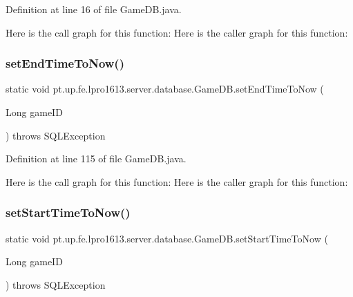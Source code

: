 Definition at line 16 of file Game\+D\+B.\+java.

Here is the call graph for this function\+:
Here is the caller graph for this function\+:
\hypertarget{classpt_1_1up_1_1fe_1_1lpro1613_1_1server_1_1database_1_1_game_d_b_ab352e7cd06250b77274f5c4f261f8116}{}\label{classpt_1_1up_1_1fe_1_1lpro1613_1_1server_1_1database_1_1_game_d_b_ab352e7cd06250b77274f5c4f261f8116} 
\subsubsection{\texorpdfstring{set\+End\+Time\+To\+Now()}{setEndTimeToNow()}}
{\footnotesize\ttfamily static void pt.\+up.\+fe.\+lpro1613.\+server.\+database.\+Game\+D\+B.\+set\+End\+Time\+To\+Now (\begin{DoxyParamCaption}\item[{Long}]{game\+ID }\end{DoxyParamCaption}) throws S\+Q\+L\+Exception\hspace{0.3cm}{\ttfamily [static]}}



Definition at line 115 of file Game\+D\+B.\+java.

Here is the call graph for this function\+:
Here is the caller graph for this function\+:
\hypertarget{classpt_1_1up_1_1fe_1_1lpro1613_1_1server_1_1database_1_1_game_d_b_a991c06b53598f46f4eea30c8c8fc31f7}{}\label{classpt_1_1up_1_1fe_1_1lpro1613_1_1server_1_1database_1_1_game_d_b_a991c06b53598f46f4eea30c8c8fc31f7} 
\subsubsection{\texorpdfstring{set\+Start\+Time\+To\+Now()}{setStartTimeToNow()}}
{\footnotesize\ttfamily static void pt.\+up.\+fe.\+lpro1613.\+server.\+database.\+Game\+D\+B.\+set\+Start\+Time\+To\+Now (\begin{DoxyParamCaption}\item[{Long}]{game\+ID }\end{DoxyParamCaption}) throws S\+Q\+L\+Exception\hspace{0.3cm}{\ttfamily [static]}}



